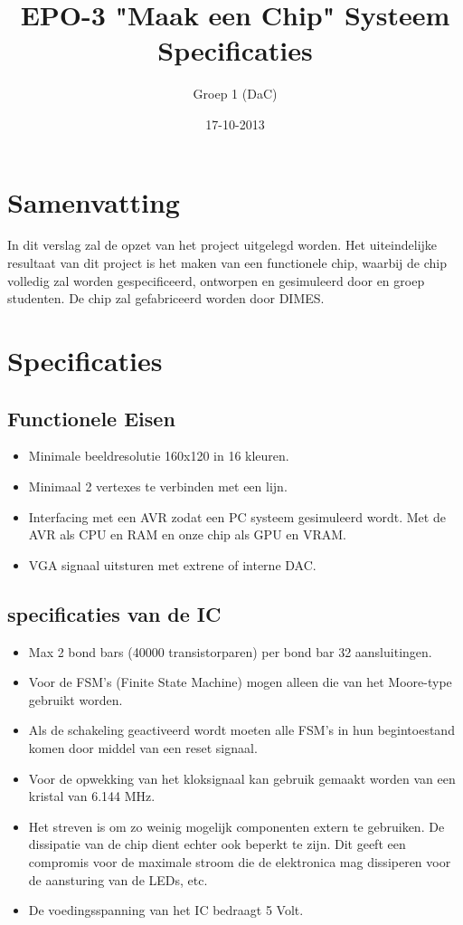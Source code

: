 \documentclass{scrartcl}
\author{Groep 1 (DaC)}
\title{EPO-3 "Maak een Chip" Systeem Specificaties}
\date{17-10-2013}
\begin{document}
\maketitle
\vspace{80 mm}
\section*{Samenvatting}
In dit verslag zal de opzet van het project uitgelegd worden. Het uiteindelijke resultaat van dit project is het maken van een functionele chip, waarbij de chip volledig zal worden gespecificeerd, ontworpen en gesimuleerd door en groep studenten. De chip zal gefabriceerd worden door DIMES. 
\newpage
\setlength{\cftbeforetoctitleskip}{-3em}

\tableofcontents
\newpage
{}
\section{Specificaties}
\subsection {Functionele Eisen}
\begin {itemize}
\item Minimale beeldresolutie 160x120  in 16  kleuren.
\item Minimaal 2 vertexes te verbinden met een lijn.
\item Interfacing met een AVR zodat een PC systeem gesimuleerd wordt. Met de AVR als CPU en RAM en onze chip als GPU en VRAM.
\item VGA signaal uitsturen met extrene of interne DAC.
\end{itemize}


\subsection {specificaties van de IC}
\begin {itemize}
\item Max 2 bond bars (40000 transistorparen) per bond bar 32 aansluitingen.
\item Voor de FSM’s (Finite State Machine) mogen alleen die van het Moore-type gebruikt worden.
\item Als de schakeling geactiveerd wordt moeten alle FSM’s in hun begintoestand komen door middel van een reset signaal.
\item Voor de opwekking van het kloksignaal kan gebruik gemaakt worden van een kristal van 6.144 MHz.
\item Het streven is om zo weinig mogelijk componenten extern te gebruiken. De dissipatie van de
chip dient echter ook beperkt te zijn. Dit geeft een compromis voor de maximale stroom die de elektronica mag dissiperen voor de aansturing van de LEDs, etc.
\item De voedingsspanning van het IC bedraagt 5 Volt.

\end{itemize}
\end{document}
